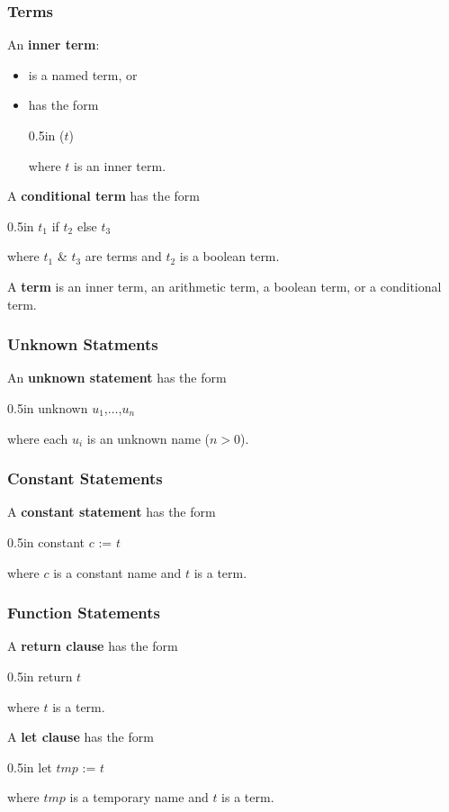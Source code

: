 \documentclass[letterpaper, 12pt]{extarticle}
\theoremstyle{definition} %
\newcommand{\textdef}[1]{\textbf{#1}}
\newenvironment{codeblock}
    {\begin{addmargin}{0.5in} \ttfamily}
    {\end{addmargin}}
\begin{document}
\subsubsection{Terms}

An \textdef{inner term}:
\begin{itemize}
\item
is a named term, or
\item
has the form
\begin{codeblock}
($t$)
\end{codeblock}
where $t$ is an inner term.
\end{itemize}

A \textdef{conditional term} has the form
\begin{codeblock}
$t_1$ if $t_2$ else $t_3$
\end{codeblock}
where $t_1$ \& $t_3$ are terms and $t_2$ is a boolean term.

A \textdef{term} is an inner term, an arithmetic term,
a boolean term, or a conditional term.

\subsubsection{Unknown Statments}

An \textdef{unknown statement} has the form
\begin{codeblock}
unknown $u_1$,$\ldots$,$u_n$
\end{codeblock}
where each $u_i$ is an unknown name ($n > 0$).

\subsubsection{Constant Statements}

A \textdef{constant statement} has the form
\begin{codeblock}
constant $c$ := $t$
\end{codeblock}
where $c$ is a constant name and $t$ is a term.

\subsubsection{Function Statements}

A \textdef{return clause} has the form
\begin{codeblock}
return $t$
\end{codeblock}
where $t$ is a term.

A \textdef{let clause} has the form
\begin{codeblock}
let $tmp$ := $t$
\end{codeblock}
where $tmp$ is a temporary name and $t$ is a term.
\end{document}
